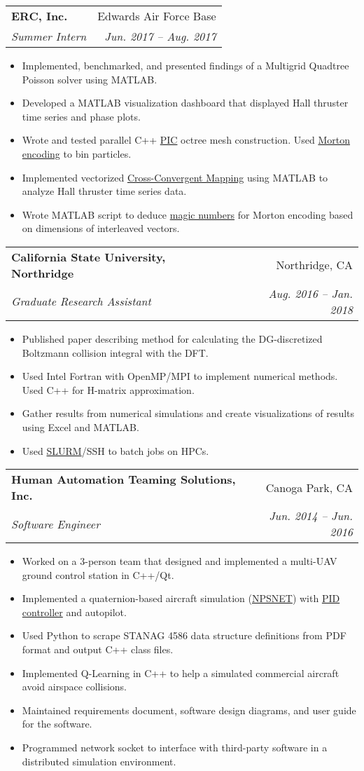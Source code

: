 \documentclass[letterpaper,11pt]{article}
\makeatletter
\newcommand{\resumeItem}[1]{
  \item\small{
    {#1 \vspace{-3pt}}
  }
}
\newcommand{\resumeSubheading}[4]{
  \vspace{-3pt}\item
    \begin{tabular*}{0.97\textwidth}[t]{l@{\extracolsep{\fill}}r}
      \textbf{#1} & #2 \\
      \textit{\small#3} & \textit{\small #4} \\
    \end{tabular*}\vspace{-5pt}
}
\newcommand{\resumeItemListStart}{\begin{itemize}}
\newcommand{\resumeItemListEnd}{\end{itemize}\vspace{-5pt}}
\makeatother
\begin{document}
    \resumeSubheading
      {ERC, Inc.}{Edwards Air Force Base}
      {Summer Intern}{Jun. 2017 -- Aug. 2017}
      \resumeItemListStart
        \resumeItem
			{Implemented, benchmarked, and presented findings of a Multigrid Quadtree Poisson solver using MATLAB.}
        \resumeItem
			{Developed a MATLAB visualization dashboard that displayed Hall thruster time series and phase plots.}
		\resumeItem	
			{Wrote and tested parallel C++ \href{https://en.wikipedia.org/wiki/Particle-in-cell}{PIC} octree mesh construction. Used \href{https://en.wikipedia.org/wiki/Z-order_curve\#Coordinate_values}{Morton encoding} to bin particles.}
		\resumeItem
   			{Implemented vectorized \href{https://www.ncbi.nlm.nih.gov/pmc/articles/PMC4592974/}{Cross-Convergent Mapping} using MATLAB to analyze Hall thruster time series data.}
   		\resumeItem
   			{Wrote MATLAB script to deduce \href{https://en.wikipedia.org/wiki/Magic_number_(programming)\#Unnamed_numerical_constants}{magic numbers} for Morton encoding based on dimensions of interleaved vectors.}
      \resumeItemListEnd

    \resumeSubheading
      {California State University, Northridge}{Northridge, CA}
      {Graduate Research Assistant}{Aug. 2016 -- Jan. 2018}
       \resumeItemListStart
        \resumeItem
			{Published paper describing method for calculating the DG-discretized Boltzmann collision integral with the DFT.}
		\resumeItem	
			{Used Intel Fortran with OpenMP/MPI to implement numerical methods. Used C++ for H-matrix approximation.}
		\resumeItem
   			{Gather results from numerical simulations and create visualizations of results using Excel and MATLAB.}
   		\resumeItem
			{Used \href{https://slurm.schedmd.com/}{SLURM}/SSH to batch jobs on HPCs.}
      \resumeItemListEnd


    \resumeSubheading
      {Human Automation Teaming Solutions, Inc.}{Canoga Park, CA}
      {Software Engineer}{Jun. 2014 -- Jun. 2016}
      \resumeItemListStart
        \resumeItem{Worked on a 3-person team that designed and implemented a multi-UAV ground control station in C++/Qt.}
        \resumeItem{Implemented a quaternion-based aircraft simulation (\href{http://citeseerx.ist.psu.edu/viewdoc/download?doi=10.1.1.50.7824&rep=rep1&type=pdf}{NPSNET}) with \href{https://en.wikipedia.org/wiki/PID_controller}{PID controller} and autopilot.}
		\resumeItem{Used Python to scrape STANAG 4586 data structure definitions from PDF format and output C++ class files.}
		\resumeItem{Implemented Q-Learning in C++ to help a simulated commercial aircraft avoid airspace collisions.}
		\resumeItem{Maintained requirements document, software design diagrams, and user guide for the software.}
		\resumeItem{Programmed network socket to interface with third-party software in a distributed simulation environment.}
      \resumeItemListEnd
\end{document}
